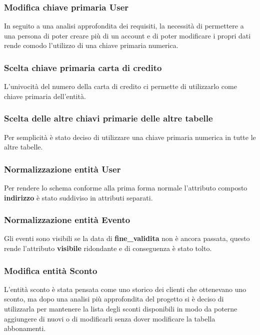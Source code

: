 \subsubsection{Modifica chiave primaria \textbf{User}}
In seguito a una analisi approfondita dei requisiti, la necessità di permettere a una persona di poter creare più di un account e di poter modificare i propri dati rende comodo l'utilizzo di una chiave primaria numerica.  

\subsubsection{Scelta chiave primaria \textbf{carta di credito}}
L'univocità del numero della carta di credito ci permette di utilizzarlo come chiave primaria dell'entità.

\subsubsection{Scelta delle altre chiavi primarie delle altre tabelle}
Per semplicità è stato deciso di utilizzare una chiave primaria numerica in tutte le altre tabelle.

\subsubsection{Normalizzazione entità \textbf{User}} 
Per rendere lo schema conforme alla prima forma normale l'attributo composto \textbf{indirizzo} è stato suddiviso in attributi separati.

\subsubsection{Normalizzazione entità \textbf{Evento}}
Gli eventi sono visibili se la data di \textbf{fine{\_}validita} non è ancora passata, questo rende l'attributo \textbf{visibile} ridondante e di conseguenza è stato tolto.

\subsubsection{Modifica entità Sconto}
L'entità sconto è stata pensata come uno storico dei clienti che ottenevano uno sconto, ma dopo una analisi più approfondita del progetto si è deciso di utilizzarla per mantenere la lista degli sconti disponibili in modo da poterne aggiungere di nuovi o di modificarli senza dover modificare la tabella abbonamenti.  

